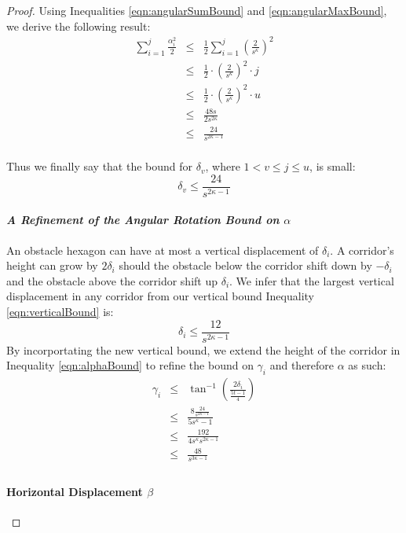 \documentclass[10pt]{CSUNthesis}
\theoremstyle{plain}%
\theoremstyle{definition}
\theoremstyle{remark}
\newcommand{\lr}[1]{\left( #1 \right)}
\begin{document}
\begin{proof}
Using Inequalities \ref{eqn:angularSumBound} and \ref{eqn:angularMaxBound}, we derive the following result:
$$
\begin{array}{rcl}
\sum_{i=1}^j \frac{\alpha_i^2}{2} &\leq& \frac{1}{2}\sum_{i=1}^j  \lr{ \frac{2}{s^\kappa} }^2\\
&\leq&\frac{1}{2}\cdot  \lr{\frac{2}{s^{\kappa}}}^2 \cdot j\\
&\leq&\frac{1}{2}\cdot  \lr{\frac{2}{s^{\kappa}}}^2 \cdot u\\
&\leq&\frac{48s}{2s^{2\kappa}}\\
&\leq&\frac{24}{s^{2\kappa-1}}\\  
\end{array}
$$

Thus we finally say that the bound for $\delta_v$, where $1<v\leq j\leq u$, is small:
\begin{equation}\label{eqn:verticalBound}
\delta_v \leq \frac{24}{s^{2\kappa-1}}
\end{equation}


\paragraph{\textit{A Refinement of the Angular Rotation Bound on $\alpha$}}
An obstacle hexagon can have at most a vertical displacement of $\delta_i$.  
A corridor's height can grow by $2 \delta_i$ should the obstacle below the corridor shift down by $-\delta_i$ and the obstacle above the corridor shift up $\delta_i$.  
We infer that the largest vertical displacement in any corridor from our vertical bound Inequality \ref{eqn:verticalBound} is:
$$\delta_i \leq \frac{12}{s^{2\kappa-1}}$$
By incorportating the new vertical bound, we extend the height of the corridor in Inequality \ref{eqn:alphaBound} to refine the bound on $\gamma_i$ and therefore $\alpha$ as such:
\begin{equation}\label{eqn:alphaBoundRefined}
\begin{array}{rcl}
\gamma_i & \leq & \tan^{-1} \lr{\frac{2 \delta_i}
									 {	\frac{5t -1}{4}	}
								}\\
&\leq& \frac{8 \frac{24}{s^{2\kappa-1}}	}
			  {	5s^\kappa -1}\\
&\leq& \frac{ 192 }
			  {	4s^\kappa	s^{2\kappa-1}} \\
&\leq& \frac{48}{s^{3\kappa-1}}\\
\end{array} 
\end{equation}

\paragraph{Horizontal Displacement $\beta$}


\end{proof}
\end{document}
